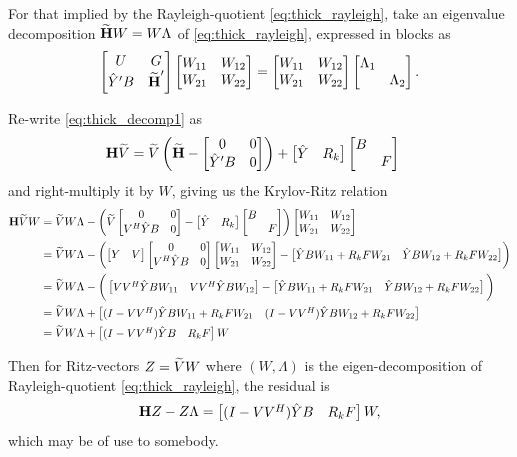 For that implied by  the Rayleigh-quotient \eqref{eq:thick_rayleigh},
   take an eigenvalue  decomposition $\widetilde{\textbf{\textup{H}}} W = W\Lambda$ of \eqref{eq:thick_rayleigh}, expressed in blocks as 
\begin{equation}
\begin{bmatrix} U & G \\  \hat{Y}^\prime B&\widetilde{\textbf{\textup{H}}}^\prime\end{bmatrix}\begin{bmatrix} W_{11}&W_{12}\\W_{21}&W_{22}\end{bmatrix} 
=
\begin{bmatrix} W_{11}&W_{12}\\W_{21}&W_{22}\end{bmatrix} 
\begin{bmatrix} \Lambda_1 &\\&\Lambda_2\end{bmatrix}.
\label{eq:rayleigh_eigen}
\end{equation}

Re-write \eqref{eq:thick_decomp1} as
\begin{align*}
\textbf{\textup{H}} \widetilde{V} &= \widetilde{V} \left(\widetilde{\textbf{\textup{H}}}-\begin{bmatrix}  0& 0 \\ \hat{Y}^\prime B&0\end{bmatrix}\right)
+  \begin{bmatrix} \hat{Y} & R_k\end{bmatrix}\begin{bmatrix} B&\\& F\end{bmatrix} \label{eq:thick_decomp2}
\end{align*}
and right-multiply it by $W$,  giving us the Krylov-Ritz relation
\begin{align*}
\H \Vt W 
&= \Vt W \Lambda- \left( \Vt \mat{ 0&0  \\ \c{V}\Yh B&0} 
-  \mat{\Yh & R_k} \mat{B&\\&F} \right) 
\mat{W_{11}&W_{12}\\W_{21}&W_{22}} \nonumber \\
%
&= \Vt W \Lambda- 
\left( \mat{Y&V} \mat{0 & 0 \\ \c{V}\Yh B&0}
\mat{W_{11}&W_{12}\\W_{21}&W_{22}}
-  \mat{\Yh B W_{11} + R_k F W_{21} &\Yh B W_{12} + R_k F W_{22}} 
	\right) \nonumber \\
&= \Vt W \Lambda- 
\bigg( \mat{V \c{V}\Yh B W_{11}&V \c{V}\Yh B W_{12}}
-  \mat{\Yh B W_{11} + R_k F W_{21} &\Yh B W_{12} + R_k F W_{22}}    \bigg) \\
%
&= \Vt W \Lambda+  
\mat{(I -V \c{V})\Yh B W_{11}+ R_k F W_{21} 
	& (I-V \c{V})\Yh B W_{12}+ R_k F W_{22}}\\
&= \Vt W \Lambda+ \mat{(I -V \c{V})\Yh B  & R_k F } W
\end{align*}

Then for Ritz-vectors $Z=\widetilde{V} W$ where $(W,\Lambda)$ is the eigen-decomposition of Rayleigh-quotient \eqref{eq:thick_rayleigh}, the residual is
\begin{align}
\textbf{\textup{H}} Z - Z \Lambda =  \begin{bmatrix} (I -V V^H)\hat{Y} B  & R_k F \end{bmatrix} W,
\end{align}
which may be of use to somebody.

